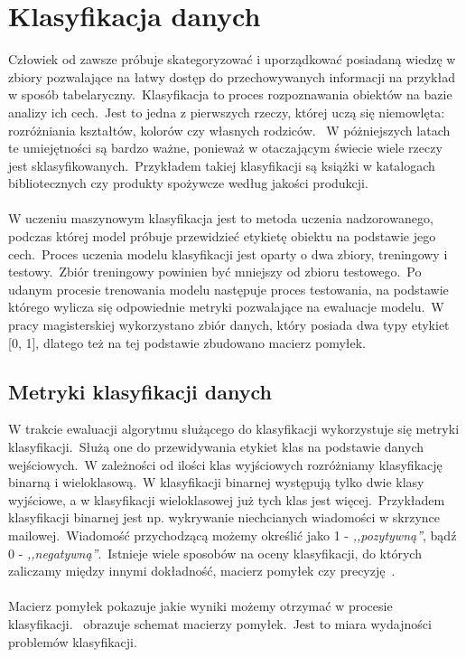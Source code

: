 \chapter{Klasyfikacja danych}

 Człowiek od zawsze próbuje skategoryzować i uporządkować posiadaną wiedzę w zbiory pozwalające na łatwy dostęp do przechowywanych informacji na przykład w sposób tabelaryczny.\ Klasyfikacja to proces rozpoznawania obiektów na bazie analizy ich cech.\ Jest to jedna z pierwszych rzeczy, której uczą się niemowlęta: rozróżniania kształtów, kolorów czy własnych rodziców. \ W póżniejszych latach te umiejętności są bardzo ważne, ponieważ w otaczającym świecie wiele rzeczy jest sklasyfikowanych.\ Przykładem takiej klasyfikacji są książki w katalogach bibliotecznych czy produkty spożywcze według jakości produkcji.
\\ \\
W uczeniu maszynowym klasyfikacja jest to metoda uczenia nadzorowanego, podczas której model próbuje przewidzieć etykietę obiektu na podstawie jego cech.\ Proces uczenia modelu klasyfikacji jest oparty o dwa zbiory, treningowy i testowy.\ Zbiór treningowy powinien być mniejszy od zbioru testowego.\ Po udanym procesie trenowania modelu następuje proces testowania, na podstawie którego wylicza się odpowiednie metryki pozwalające na ewaluacje modelu.\ W pracy magisterskiej wykorzystano zbiór danych, który posiada dwa typy etykiet [0, 1], dlatego też na tej podstawie zbudowano macierz pomyłek.

\section{Metryki klasyfikacji danych}
W trakcie ewaluacji algorytmu służącego do klasyfikacji wykorzystuje się metryki klasyfikacji.\ Służą one do przewidywania etykiet klas na podstawie danych wejściowych.\ W zależności od ilości klas wyjściowych rozróżniamy klasyfikację binarną i wieloklasową.\ W klasyfikacji binarnej występują tylko dwie klasy wyjściowe, a w klasyfikacji wieloklasowej już tych klas jest więcej.\ Przykładem klasyfikacji binarnej jest np. wykrywanie niechcianych wiadomości w skrzynce mailowej.\ Wiadomość przychodzącą możemy określić jako 1 - \textit{,,pozytywną''}, bądź 0 - \textit{,,negatywną''}.\ Istnieje wiele sposobów na oceny klasyfikacji, do których zaliczamy między innymi dokładność, macierz pomyłek czy precyzję~\cite{Agrawal2024}.
\\ \\
Macierz pomyłek pokazuje jakie wyniki możemy otrzymać w procesie klasyfikacji.\  obrazuje schemat macierzy pomyłek.\ Jest to miara wydajności problemów klasyfikacji.

